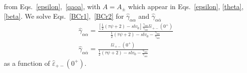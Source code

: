 \documentclass[pre,aps,superscriptaddress,nofootinbib]{revtex4}
\begin{document}
from Eqs.~\ref{epsilon},~\ref{qaoa}, with $A = A_{\pm}$ which appear in Eqs.~\ref{epsilon}, \ref{theta}, \ref{beta}. We solve Eqs.~\ref{BCr1},~\ref{BCr2} for $\hat{\gamma}_{\alpha\alpha}$ and $\hat{\gamma}_{\alpha\overline{\alpha}}$
\begin{eqnarray}
\label{hgaa}
\hat{\gamma}_{\alpha\alpha} = \frac{\left[\frac{1}{2} (\tau \psi + 2) - s l v_0\right] \frac{\gamma_{\alpha\alpha}}{\gamma_{\alpha\overline{\alpha}}} l \hat{\varepsilon}_{+-}(0^+)}{\frac{1}{2}(\tau\psi + 2) - s l v_0 - \frac{\gamma_{\alpha\alpha}}{\gamma_{\alpha\overline{\alpha}}}}\\
\label{hgaoa}
\hat{\gamma}_{\alpha\overline{\alpha}} = \frac{l \hat{\varepsilon}_{+-}(0^+)}{\frac{1}{2}(\tau\psi + 2) - s l v_0 - \frac{\gamma_{\alpha\alpha}}{\gamma_{\alpha\overline{\alpha}}}}
\end{eqnarray}
as a function of $\hat{\varepsilon}_{+-}(0^+)$.\\
\end{document}
